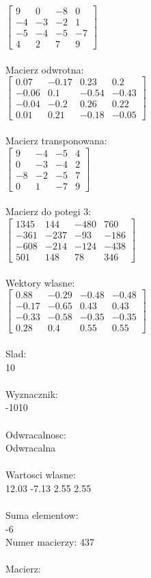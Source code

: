 \documentclass[a4paper,12pt]{article}
\begin{document}
$\begin{bmatrix} 9&0&-8&0\\-4&-3&-2&1\\-5&-4&-5&-7\\4&2&7&9 \end{bmatrix}$
\\
\\
Macierz odwrotna:\\

$\begin{bmatrix} 0.07&-0.17&0.23&0.2\\-0.06&0.1&-0.54&-0.43\\-0.04&-0.2&0.26&0.22\\0.01&0.21&-0.18&-0.05 \end{bmatrix}$
\\
\\
Macierz transponowana:\\

$\begin{bmatrix} 9&-4&-5&4\\0&-3&-4&2\\-8&-2&-5&7\\0&1&-7&9 \end{bmatrix}$
\\
\\
Macierz do potegi 3:\\

$\begin{bmatrix} 1345&144&-480&760\\-361&-237&-93&-186\\-608&-214&-124&-438\\501&148&78&346 \end{bmatrix}$
\\
\\
Wektory wlasne:\\

$\begin{bmatrix} 0.88&-0.29&-0.48&-0.48\\-0.17&-0.65&0.43&0.43\\-0.33&-0.58&-0.35&-0.35\\0.28&0.4&0.55&0.55 \end{bmatrix}$
\\
\\
Slad:\\
10
\\
\\
Wyznacznik:\\
-1010
\\
\\
Odwracalnosc:\\
Odwracalna
\\
\\
Wartosci wlasne:\\
12.03 -7.13 2.55 2.55
\\
\\
Suma elementow:\\
-6
\\
\newpage
Numer macierzy:
437
\\
\\
Macierz:\\
\end{document}
